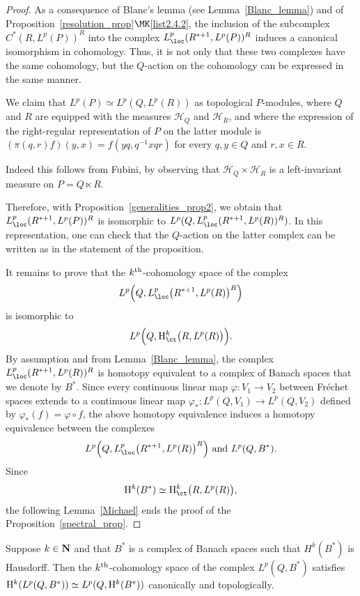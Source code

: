 \begin{proof}
As a consequence of Blanc's lemma (see Lemma~\ref{Blanc_lemma}) and of Proposition~\ref{resolution_prop}$\MK$\eqref{list2.4.2}, the inclusion of the subcomplex $C^*(R, L^p(P))^R$ into the complex $L _{\loc} ^p (R^{*+1}, L^p (P))^R$ induces a canonical isomorphism in cohomology. Thus, it is not only that these two complexes have the same cohomology, but the $Q$-action on the cohomology can be expressed in the same manner.

We claim that $L^p(P) \simeq L^p (Q, L^p(R))$ as topological $P$-modules, where $Q$ and $R$ are equipped with the measures $\mathcal H _Q$  and $\mathcal H _R$, and where the expression of the right-regular representation of $P$ on the latter module is $(\pi(q, r)f)(y, x) = f(yq,  q^{-1}xqr)$ for every $q,y \in Q$ and $r,x \in R$.

Indeed this follows from Fubini, by observing that $\mathcal H _Q \times \mathcal H _R$ is a left-invariant measure on $P = Q \ltimes R$.

Therefore, with Proposition~\ref{generalities_prop2}, we obtain that $L _{\loc} ^p (R^{*+1}, L^p (P))^R$ is isomorphic to $L^p (Q, L _{\loc} ^p (R^{*+1}, L^p (R))^R)$. In this representation, one can check that the $Q$-action on the latter complex can be written as in the statement of the proposition.

It remains to prove that the $k^{\rm th}$-cohomology space of the complex 
\[
L^p \Bigl(Q, L _{\loc}^p \bigl(R^{*+1}, L^p (R)\bigr)^R \Bigr)\]
is isomorphic to
\[
L^p \Bigl(Q, {\rm H}_{\ct}^k \big(R,L^p(R)\big)\Bigr).
\]
By assumption and from Lemma~\ref{Blanc_lemma}, the complex $L _{\loc} ^p (R^{*+1}, L^p(R))^R $ is homotopy equivalent to a complex of Banach spaces that we denote by $B^*$. Since every continuous linear map $\varphi: V_1 \to V_2$ between Fréchet spaces extends to a continuous linear map $\varphi _*: L^p (Q, V_1) \to L^p(Q, V_2)$ defined by $\varphi _* (f) = \varphi \circ f$, the above homotopy equivalence induces a homotopy equivalence between the complexes
\[
L^p \Bigl(Q, L _{\loc} ^p \bigl(R^{*+1}, L^p (R)\bigr)^R\Bigr)\text{ and } L^p (Q, B^*).
\]
Since
\[
{\rm H}^k (B^*) \simeq {\rm H}_{\ct}^k \bigl(R,L^p(R)\bigr),
\]
the following Lemma~\ref{Michael} ends the proof of the Proposition~\ref{spectral_prop}.
\end{proof}

\begin{lemm}\label{Michael}
Suppose $k \in {\bf N}$ and that $B^*$ is a complex of Banach spaces such that $H ^k (B^*)$ is Hausdorff. Then the $k^{\rm th}$-cohomology space of the complex $L^p(Q,B^*)$ satisfies ${\rm H}^k(L^p(Q, B^*)) \simeq L^p (Q, {\rm H}^k (B^*))$ canonically and topologically.
\end{lemm}

